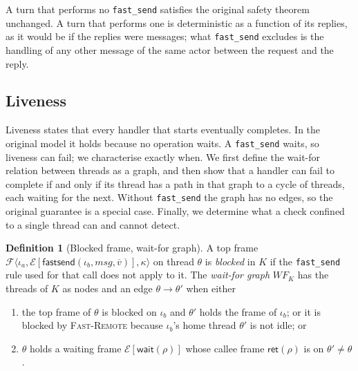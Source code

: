 \documentclass[11pt]{article}
\theoremstyle{definition}
\newtheorem{definition}[theorem]{Definition}
\theoremstyle{remark}
\newcommand{\fs}{\texttt{fast\_send}}
\newcommand{\Frm}[1]{\mathcal{F}\langle #1\rangle}
\newcommand{\ctx}[1]{\mathcal{E}[#1]}
\newcommand{\ret}[1]{\mathsf{ret}(#1)}
\newcommand{\wait}[1]{\mathsf{wait}(#1)}
\newcommand{\fsend}{\mathsf{fastsend}}
\begin{document}
A turn that performs no \fs{} satisfies the original safety theorem unchanged. A turn
that performs one is deterministic as a function of its replies, as it would be if the
replies were messages; what \fs{} excludes is the handling of any other message of the
same actor between the request and the reply.

\subsection{Liveness}
\label{sec:live}

Liveness states that every handler that starts eventually completes. In the original
model it holds because no operation waits. A \fs{} waits, so liveness can fail; we
characterise exactly when. We first define the wait-for relation between threads as a
graph, and then show that a handler can fail to complete if and only if its
thread has a path in that graph to a cycle of threads, each waiting for the next.
Without \fs{} the graph has no edges, so the original guarantee is a special case.
Finally, we determine what a check confined to a single thread can and cannot detect.


\begin{definition}[Blocked frame, wait-for graph]
A top frame $\Frm{\iota_a, \ctx{\fsend(\iota_b, msg, \overline{v})}, \kappa}$ on thread
$\theta$ is \emph{blocked} in $K$ if the \fs{} rule used for that call does not apply to it. The \emph{wait-for
graph} $\mathit{WF}_K$ has the threads of $K$ as nodes and an edge $\theta \to \theta'$ when either
\begin{enumerate}[label=(\roman*),leftmargin=2em]
  \item the top frame of $\theta$ is blocked on $\iota_b$ and $\theta'$ holds the frame
  of $\iota_b$; or it is blocked by \textsc{Fast-Remote} because $\iota_b$'s home thread
  $\theta'$ is not idle; or
  \item $\theta$ holds a waiting frame $\ctx{\wait{\rho}}$ whose callee frame $\ret{\rho}$
  is on $\theta' \neq \theta$.
\end{enumerate}
\end{definition}
\end{document}
